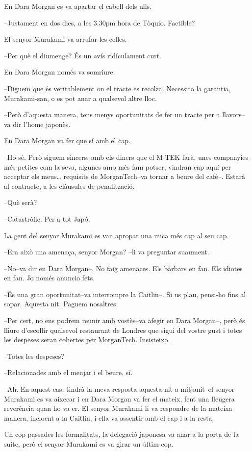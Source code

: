 En Dara Morgan es va apartar el cabell dels ulls.

--Justament en dos dies, a les 3.30pm hora de Tòquio. Factible?

El senyor Murakami va arrufar les celles.

--Per què el diumenge? És un avís ridículament curt.

En Dara Morgan només va somriure.

--Diguem que és veritablement on el tracte es recolza. Necessito la
garantia, Murakami-san, o es pot anar a qualsevol altre lloc.

--Però d'aquesta manera, tens menys oportunitats de fer un tracte per a
llavors--va dir l'home japonès.

En Dara Morgan va fer que sí amb el cap.

--Ho sé. Però siguem sincers, amb els diners que el M-TEK farà, unes
companyies més petites com la seva, algunes amb més fam potser, vindran
cap aquí per acceptar els meus\ldots{} requisits de MorganTech--va
tornar a beure del café--. Estarà al contracte, a les clàusules de
penalització.

--Què serà?

--Catastròfic. Per a tot Japó.

La gent del senyor Murakami es van apropar una mica més cap al seu cap.

--Era això una amenaça, senyor Morgan? --li va preguntar suaument.

--No--va dir en Dara Morgan--. No faig amenaces. Els bàrbars en fan. Els
idiotes en fan. Jo només anuncio fets.

--És una gran oportunitat--va interrompre la Caitlin--. Si us plau,
pensi-ho fins al sopar. Aquesta nit. Paguem nosaltres.

--Per cert, no ens podrem reunir amb vostès--va afegir en Dara Morgan--,
però és lliure d'escollir qualsevol restaurant de Londres que sigui del
vostre gust i totes les despeses seran cobertes per MorganTech.
Insisteixo.

--Totes les despeses?

--Relacionades amb el menjar i el beure, sí.

--Ah. En aquest cas, tindrà la meva resposta aquesta nit a mitjanit--el
senyor Murakami es va aixecar i en Dara Morgan va fer el mateix, fent
una lleugera reverència quan ho va er. El senyor Murakami li va
respondre de la mateixa manera, incloent a la Caitlin, i ella va
assentir amb el cap i a la resta.

Un cop passades les formalitats, la delegació japonesa va anar a la
porta de la suite, però el senyor Murakami es va girar un últim cop.

